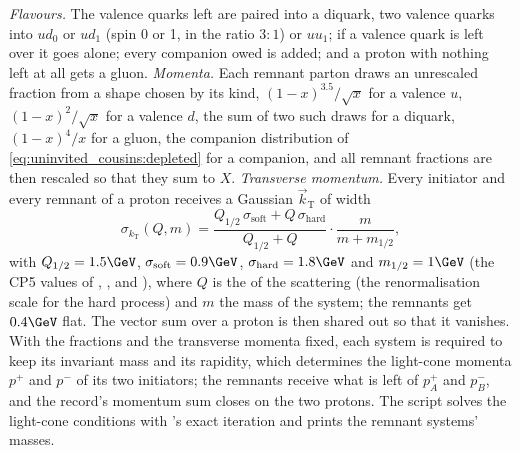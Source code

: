 \emph{Flavours.} The valence quarks left are paired into a diquark, two
valence quarks into $ud_0$ or $ud_1$ (spin 0 or 1, in the ratio $3:1$) or
$uu_1$; if a valence quark is left over it goes alone; every companion owed
is added; and a proton with nothing left at all gets a gluon. \emph{Momenta.}
Each remnant parton draws an unrescaled fraction from a shape chosen by its
kind, $(1-x)^{3.5}/\sqrt x$ for a valence $u$, $(1-x)^2/\sqrt x$ for a
valence $d$, the sum of two such draws for a diquark, $(1-x)^4/x$ for a
gluon, the companion distribution of \cref{eq:uninvited_cousins:depleted}
for a companion, and all remnant fractions are then rescaled so that they
sum to $X$. \emph{Transverse momentum.} Every initiator and every remnant
of a proton receives a Gaussian $\vec k_{\mathrm{T}}$ of width
\begin{equation}
  \sigma_{k_{\mathrm{T}}}(Q,m)=\frac{Q_{1/2}\,\sigma_{\mathrm{soft}}+Q\,\sigma_{\mathrm{hard}}}{Q_{1/2}+Q}\cdot\frac{m}{m+m_{1/2}},
  \label{eq:uninvited_cousins:kt}
\end{equation}
with $Q_{1/2}=1.5\GeV$, $\sigma_{\mathrm{soft}}=0.9\GeV$,
$\sigma_{\mathrm{hard}}=1.8\GeV$ and $m_{1/2}=1\GeV$ (the CP5 values of
, ,
 and ), where $Q$ is the \pt of
the scattering (the renormalisation scale for the hard process) and $m$ the
mass of the system; the remnants get $0.4\GeV$ flat. The vector sum over a
proton is then shared out so that it vanishes. With the fractions and the transverse momenta fixed, each system
is required to keep its invariant mass and its rapidity, which determines
the light-cone momenta $p^+$ and $p^-$ of its two initiators; the remnants
receive what is left of $p^+_A$ and $p^-_B$, and the record's momentum sum
closes on the two protons. The script solves the light-cone conditions with
\PYTHIA's exact iteration and prints the remnant systems' masses.

